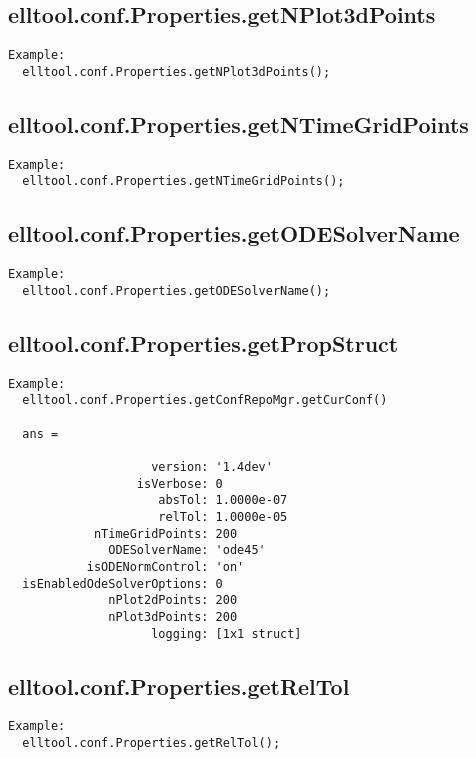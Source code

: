 \subsection{\texorpdfstring{elltool.conf.Properties.getNPlot3dPoints}{getNPlot3dPoints}}\label{method:elltool.conf.Properties.getNPlot3dPoints}
\begin{verbatim}
Example:
  elltool.conf.Properties.getNPlot3dPoints();
\end{verbatim}
\subsection{\texorpdfstring{elltool.conf.Properties.getNTimeGridPoints}{getNTimeGridPoints}}\label{method:elltool.conf.Properties.getNTimeGridPoints}
\begin{verbatim}
Example:
  elltool.conf.Properties.getNTimeGridPoints();
\end{verbatim}
\subsection{\texorpdfstring{elltool.conf.Properties.getODESolverName}{getODESolverName}}\label{method:elltool.conf.Properties.getODESolverName}
\begin{verbatim}
Example:
  elltool.conf.Properties.getODESolverName();
\end{verbatim}
\subsection{\texorpdfstring{elltool.conf.Properties.getPropStruct}{getPropStruct}}\label{method:elltool.conf.Properties.getPropStruct}
\begin{verbatim}
Example:
  elltool.conf.Properties.getConfRepoMgr.getCurConf()

  ans =

                    version: '1.4dev'
                  isVerbose: 0
                     absTol: 1.0000e-07
                     relTol: 1.0000e-05
            nTimeGridPoints: 200
              ODESolverName: 'ode45'
           isODENormControl: 'on'
  isEnabledOdeSolverOptions: 0
              nPlot2dPoints: 200
              nPlot3dPoints: 200
                    logging: [1x1 struct]
\end{verbatim}
\subsection{\texorpdfstring{elltool.conf.Properties.getRelTol}{getRelTol}}\label{method:elltool.conf.Properties.getRelTol}
\begin{verbatim}
Example:
  elltool.conf.Properties.getRelTol();
\end{verbatim}
